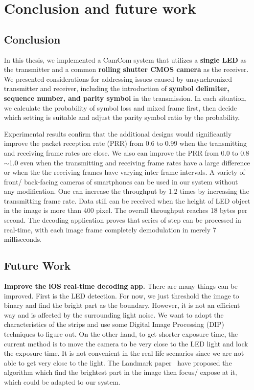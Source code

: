 \section{Conclusion and future work}

\subsection{Conclusion}
In this thesis, we implemented a CamCom system that utilizes a \textbf{single LED} as the transmitter and a common \textbf{rolling shutter CMOS camera} as the receiver. We presented considerations for addressing issues caused by unsynchronized transmitter and receiver, including the introduction of \textbf{symbol delimiter, sequence number, and parity symbol} in the transmission. In each situation, we calculate the probability of symbol loss and mixed frame first, then decide which setting is suitable and adjust the parity symbol ratio by the probability. 

Experimental results confirm that the additional designs would significantly improve the packet reception rate (PRR) from 0.6 to 0.99 when the transmitting and receiving frame rates are close. We also can improve the PRR from 0.0 to 0.8$\sim$1.0 even when the transmitting and receiving frame rates have a large difference or when the the receiving frames have varying inter-frame intervals. A variety of front/ back-facing cameras of smartphones can be used in our system without any modification. One can increase the throughput by 1.2 times by increasing the transmitting frame rate. Data still can be received when the height of LED object in the image is more than 400 pixel. The overall throughput reaches 18 bytes per second. The decoding application proves that series of step can be processed in real-time, with each image frame completely demodulation in merely 7 milliseconds.

\subsection{Future Work}
\textbf{Improve the iOS real-time decoding app.} There are many things can be improved. First is the LED detection. For now, we just threshold the image to binary and find the bright part as the boundary. However, it is not an efficient way and is affected by the surrounding light noise. We want to adopt the characteristics of the strips and use some Digital Image Processing (DIP) techniques to figure out.
On the other hand, to get shorter exposure time, the current method is to move the camera to be very close to the LED light and lock the exposure time. It is not convenient in the real life scenarios since we are not able to get very close to the light. The Landmark paper~\cite{landmark} have proposed the algorithm which find the brightest part in the image then focus/ expose at it, which could be adapted to our system.

